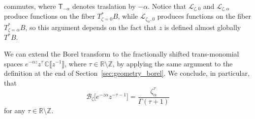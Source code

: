 \documentclass{article}
\newcommand{\Z}{\mathbb{Z}}
\newcommand{\R}{\mathbb{R}}
\newcommand{\C}{\mathbb{C}}
\newcommand{\laplace}{\mathcal{L}}
\newcommand{\borel}{\mathcal{B}}
\theoremstyle{definition}
\theoremstyle{plain}
\newenvironment{revised}{\color{DarkBlue}}{\color{black}}
\begin{document}
commutes, where $\mathsf{T}_{-\alpha}$ denotes traslation by $-\alpha$. Notice that $\laplace_{\zeta, 0}$ and $\laplace_{\zeta, \alpha}$ produce functions on the fiber $T^*_{\zeta = 0}B$, while $\laplace_{\zeta_\alpha, 0}$ produces functions on the fiber $T^*_{\zeta = \alpha}B$, so this argument depends on the fact that $z$ is defined almost globally $T^*B$.

\begin{revised}
We can extend the Borel transform to the fractionally shifted trans-monomial spaces $e^{-\alpha z} z^\tau\,\C\llbracket z^{-1} \rrbracket$, where $\tau \in \R \setminus \Z$, by applying the same argument to the definition at the end of Section~\ref{sec:geometry_borel}. We conclude, in particular, that
\[\borel_{\zeta}\big[e^{-z\alpha}z^{-\tau-1}\big] = \frac{\zeta_\alpha^\tau}{\Gamma(\tau+1)}\]
for any $\tau \in \R\setminus\Z$.
\end{revised}
\end{document}
